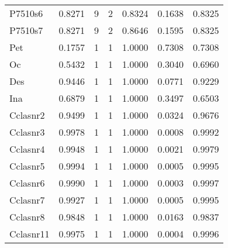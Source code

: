 \begin{longtable}{lrrrrrr}
P7510s6 & 0.8271 & 9 & 2 & 0.8324 & 0.1638 & 0.8325 \\
P7510s7 & 0.8271 & 9 & 2 & 0.8646 & 0.1595 & 0.8325 \\
Pet & 0.1757 & 1 & 1 & 1.0000 & 0.7308 & 0.7308 \\
Oc & 0.5432 & 1 & 1 & 1.0000 & 0.3040 & 0.6960 \\
Des & 0.9446 & 1 & 1 & 1.0000 & 0.0771 & 0.9229 \\
Ina & 0.6879 & 1 & 1 & 1.0000 & 0.3497 & 0.6503 \\
Cclasnr2 & 0.9499 & 1 & 1 & 1.0000 & 0.0324 & 0.9676 \\
Cclasnr3 & 0.9978 & 1 & 1 & 1.0000 & 0.0008 & 0.9992 \\
Cclasnr4 & 0.9948 & 1 & 1 & 1.0000 & 0.0021 & 0.9979 \\
Cclasnr5 & 0.9994 & 1 & 1 & 1.0000 & 0.0005 & 0.9995 \\
Cclasnr6 & 0.9990 & 1 & 1 & 1.0000 & 0.0003 & 0.9997 \\
Cclasnr7 & 0.9927 & 1 & 1 & 1.0000 & 0.0005 & 0.9995 \\
Cclasnr8 & 0.9848 & 1 & 1 & 1.0000 & 0.0163 & 0.9837 \\
Cclasnr11 & 0.9975 & 1 & 1 & 1.0000 & 0.0004 & 0.9996 \\
\end{longtable}